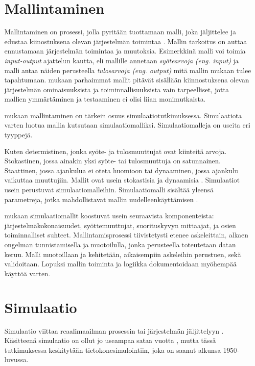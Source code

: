 \documentclass[utf8]{gradu3}
\begin{document}
\section{Mallintaminen} \label{mallintaminen}
Mallintaminen on prosessi, jolla pyritään tuottamaan malli, joka jäljittelee 
ja edustaa kiinostuksena olevan järjestelmän toimintaa \parencite{maria1997introduction}. 
Mallin tarkoitus on auttaa ennustamaan järjestelmän toimintaa ja muutoksia.
Esimerkkinä malli voi toimia \textit{input-output} ajattelun kautta, 
eli mallille annetaan \textit{syötearvoja (eng. input)} ja malli antaa näiden perusteella
\textit{tulosarvoja (eng. output)} mitä mallin mukaan tulee tapahtumaan.
\textcite{maria1997introduction} mukaan parhaimmat mallit pitävät 
sisällään kiinnostuksena olevan järjestelmän 
ominaisuuksista ja toiminnallisuuksista vain tarpeelliset, 
jotta mallien ymmärtäminen ja testaaminen ei olisi liian monimutkaista.

\textcite{maria1997introduction} mukaan mallintaminen on tärkein osuus simulaatiotutkimuksessa.
Simulaatiota varten luotua mallia kutsutaan simulaatiomalliksi.
Simulaatiomalleja on useita eri tyyppejä. 
\begin{comment}
    Mallin sisäiset rakenteetkin ovat deterministisiä. Oleellista on, että samalla syötteellä saa aina saman tuloksen (samoilla mallin parametreilla).
\end{comment}
Kuten determistinen, jonka syöte- ja tulosmuuttujat ovat kiinteitä arvoja. 
Stokastinen, jossa ainakin yksi syöte- tai tulosmuuttuja on satunnainen. 
Staattinen, jossa ajankulua ei oteta huomioon tai dynaaminen, 
jossa ajankulu vaikuttaa muuttujiin. Mallit ovat usein stokastisia ja dynaamisia \parencite{maria1997introduction}. 
Simulaatiot usein perustuvat simulaatiomalleihin. Simulaatiomalli sisältää yleensä parametreja,
jotka mahdollistavat mallin uudelleenkäyttämisen \parencite{introduction2005simulation}. 

\textcite{maria1997introduction} mukaan simulaatiomallit koostuvat usein seuraavista komponenteista: järjestelmäkokonaisuudet, syöttemuuttujat, suorituskyvyn mittaajat,
ja osien toiminnalliset suhteet. Mallintamisprosessi tiivistetysti etenee askeleittain, alkaen ongelman tunnistamisella ja muotoilulla, 
jonka perusteella toteutetaan datan keruu. Malli muotoillaan ja kehitetään, 
aikaisempiin askeleihin perustuen, sekä validoitaan. Lopuksi mallin toiminta ja logiikka dokumentoidaan myöhempää käyttöä varten.

\section{Simulaatio} \label{simulaatio}
Simulaatio viittaa reaalimaailman prosessin tai 
järjestelmän jäljittelyyn \parencite{banks1999introduction}. 
Käsitteenä simulaatio on ollut jo useampaa sataa vuotta 
\parencite{HistoryOfSimulation}, 
mutta tässä tutkimuksessa keskitytään tietokonesimulointiin, 
joka on saanut alkunsa 1950-luvussa. 
%
\parencites%
    {HistoryOfSimulation}%
    {historyOfSimulation1996}
\relax
%
\end{document}

